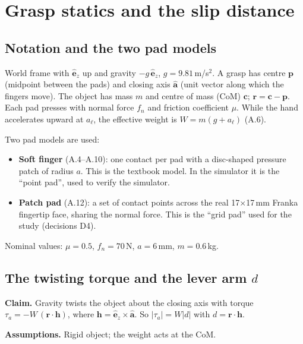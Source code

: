 \documentclass[11pt]{article}
\numberwithin{equation}{section}
\newcommand{\ez}{\hat{\bm e}_z}
\newcommand{\ah}{\hat{\bm a}}
\begin{document}
\section{Grasp statics and the slip distance}

\subsection{Notation and the two pad models}
World frame with $\ez$ up and gravity $-g\,\ez$, $g = 9.81$\,m/s$^2$. A grasp has centre $\bm p$ (midpoint between the pads) and closing axis $\ah$ (unit vector along which the fingers move). The object has mass $m$ and centre of mass (CoM) $\bm c$; $\bm r = \bm c - \bm p$. Each pad presses with normal force $f_n$ and friction coefficient $\mu$. While the hand accelerates upward at $a_\ell$, the effective weight is $W = m(g+a_\ell)$ (A.6).

Two pad models are used:
\begin{itemize}
  \item \textbf{Soft finger} (A.4--A.10): one contact per pad with a disc-shaped pressure patch of radius $a$. This is the textbook model. In the simulator it is the ``point pad'', used to verify the simulator.
  \item \textbf{Patch pad} (A.12): a set of contact points across the real 17$\times$17\,mm Franka fingertip face, sharing the normal force. This is the ``grid pad'' used for the study (decisions D4).
\end{itemize}
Nominal values: $\mu = 0.5$, $f_n = 70$\,N, $a = 6$\,mm, $m = 0.6$\,kg.

\subsection{The twisting torque and the lever arm $d$}
\textbf{Claim.} Gravity twists the object about the closing axis with torque $\tau_a = -W\,(\bm r\cdot\bm h)$, where $\bm h = \ez\times\ah$. So $|\tau_a| = W|d|$ with $d = \bm r\cdot\bm h$.

\textbf{Assumptions.} Rigid object; the weight acts at the CoM.
\end{document}
